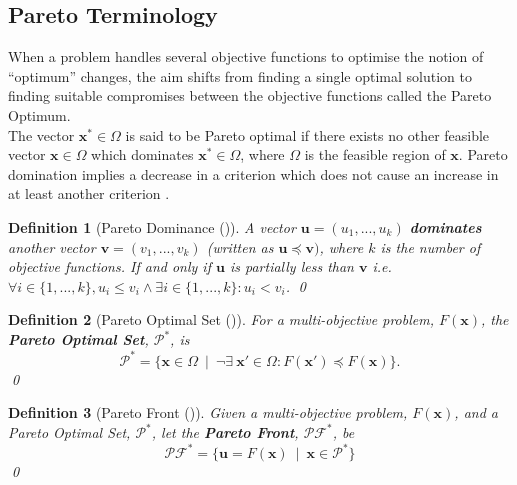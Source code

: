 \documentclass[mscthesis, 11pt]{usiinfthesis}
\theoremstyle{newdefinition}
\newtheorem{definition}{Definition}[section]
\begin{document}
\subsection{Pareto Terminology}
When a problem handles several objective functions to optimise the notion of ``optimum'' changes, the aim shifts from finding a single optimal solution to finding suitable compromises between the objective functions called the Pareto Optimum. \\
The vector $\mathbf{x^*} \in \Omega$ is said to be Pareto optimal if there exists no other feasible vector $\mathbf{x} \in \Omega$ which dominates $\mathbf{x^*} \in \Omega$, where $\Omega$ is the feasible region of $\mathbf{x}$. Pareto domination implies a decrease in a criterion which does not cause an increase in at least another criterion \cite[~pp.~10--11]{coello_coello_basic_2007}. 
\begin{definition}[Pareto Dominance (\cite{coello_coello_basic_2007})]
    A vector $\mathbf{u} = (u_1, ..., u_k)$ \textit{\textbf{dominates}} another vector $\mathbf{v} = (v_1, ..., v_k)$ (written as $\mathbf{u} \preceq \mathbf{v})$, where $k$ is the number of objective functions. If and only if $\mathbf{u}$ is \textit{partially less than} $\mathbf{v}$ i.e. $\forall i \in \{1,...,k\}, u_i \leq v_i \land \exists i \in \{1,...,k\} : u_i < v_i$. \qed 
\end{definition}


\begin{definition}[Pareto Optimal Set (\cite{coello_coello_basic_2007})]
For a multi-objective problem, $F(\mathbf{x})$, the \textbf{Pareto Optimal Set}, $\mathcal{P}^*$, is
\begin{equation}
    \mathcal{P}^* = \{\mathbf{x} \in \Omega \enspace \vert \enspace \lnot \exists \: \mathbf{x'} \in \Omega : F(\mathbf{x'}) \preceq F(\mathbf{x})\}.
\end{equation}
\qed
\end{definition}
\begin{definition}[Pareto Front
(\cite{coello_coello_basic_2007})]
Given a multi-objective problem, $F(\mathbf{x})$, and a Pareto Optimal Set, $\mathcal{P}^*$, let the \textbf{Pareto Front}, $\mathcal{PF}^*$, be
\begin{equation}
    \mathcal{PF}^* = \{\mathbf{u} = F(\mathbf{x}) \enspace \vert \enspace \mathbf{x} \in \mathcal{P^*}\}
\end{equation}
\qed
\end{definition}
\clearpage
\end{document}
